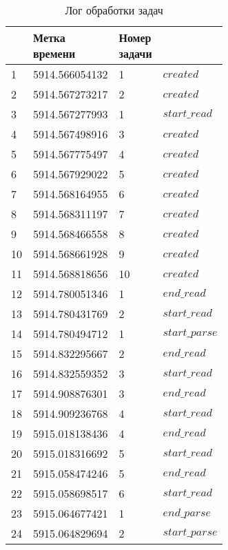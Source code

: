 \begin{longtable}{|p{}|p{}|p{}|p{}|}
	\caption{\label{tab:log}Лог обработки задач} \\
	\hline
	\makecell{№} & \makecell{Метка\\времени} & \makecell{Номер\\задачи} & \makecell{Событие} \\  
	\hline
	1 & 5914.566054132 & 1 & $created$\\
	\hline
	2 & 5914.567273217 & 2 & $created$\\
	\hline
	3 & 5914.567277993 & 1 & $start\_read$\\
	\hline
	4 & 5914.567498916 & 3 & $created$\\
	\hline
	5 & 5914.567775497 & 4 & $created$\\
	\hline
	6 & 5914.567929022 & 5 & $created$\\
	\hline
	7 & 5914.568164955 & 6 & $created$\\
	\hline
	8 & 5914.568311197 & 7 & $created$\\
	\hline
	9 & 5914.568466558 & 8 & $created$\\
	\hline
	10 & 5914.568661928 & 9 & $created$\\
	\hline
	11 & 5914.568818656 & 10 & $created$\\
	\hline
	12 & 5914.780051346 & 1 & $end\_read$\\
	\hline
	13 & 5914.780431769 & 2 & $start\_read$\\
	\hline
	14 & 5914.780494712 & 1 & $start\_parse$\\
	\hline
	15 & 5914.832295667 & 2 & $end\_read$\\
	\hline
	16 & 5914.832559352 & 3 & $start\_read$\\
	\hline
	17 & 5914.908876301 & 3 & $end\_read$\\
	\hline
	18 & 5914.909236768 & 4 & $start\_read$\\
	\hline
	19 & 5915.018138436 & 4 & $end\_read$\\
	\hline
	20 & 5915.018316692 & 5 & $start\_read$\\
	\hline
	21 & 5915.058474246 & 5 & $end\_read$\\
	\hline
	22 & 5915.058698517 & 6 & $start\_read$\\
	\hline
	23 & 5915.064677421 & 1 & $end\_parse$\\
	\hline
	24 & 5915.064829694 & 2 & $start\_parse$\\

\end{longtable}

